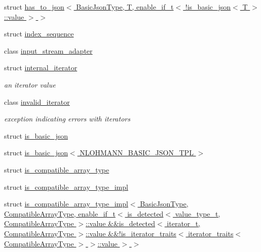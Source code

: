 \begin{DoxyCompactItemize}
\item 
struct \hyperlink{structnlohmann_1_1detail_1_1has__to__json_3_01BasicJsonType_00_01T_00_01enable__if__t_3_01_9is__4a8838c1c30336126696a126041e661c}{has\+\_\+to\+\_\+json$<$ Basic\+Json\+Type, T, enable\+\_\+if\+\_\+t$<$ !is\+\_\+basic\+\_\+json$<$ T $>$\+::value $>$ $>$}
\item 
struct \hyperlink{structnlohmann_1_1detail_1_1index__sequence}{index\+\_\+sequence}
\item 
class \hyperlink{classnlohmann_1_1detail_1_1input__stream__adapter}{input\+\_\+stream\+\_\+adapter}
\item 
struct \hyperlink{structnlohmann_1_1detail_1_1internal__iterator}{internal\+\_\+iterator}
\begin{DoxyCompactList}\small\item\em an iterator value \end{DoxyCompactList}\item 
class \hyperlink{classnlohmann_1_1detail_1_1invalid__iterator}{invalid\+\_\+iterator}
\begin{DoxyCompactList}\small\item\em exception indicating errors with iterators \end{DoxyCompactList}\item 
struct \hyperlink{structnlohmann_1_1detail_1_1is__basic__json}{is\+\_\+basic\+\_\+json}
\item 
struct \hyperlink{structnlohmann_1_1detail_1_1is__basic__json_3_01NLOHMANN__BASIC__JSON__TPL_01_4}{is\+\_\+basic\+\_\+json$<$ N\+L\+O\+H\+M\+A\+N\+N\+\_\+\+B\+A\+S\+I\+C\+\_\+\+J\+S\+O\+N\+\_\+\+T\+P\+L $>$}
\item 
struct \hyperlink{structnlohmann_1_1detail_1_1is__compatible__array__type}{is\+\_\+compatible\+\_\+array\+\_\+type}
\item 
struct \hyperlink{structnlohmann_1_1detail_1_1is__compatible__array__type__impl}{is\+\_\+compatible\+\_\+array\+\_\+type\+\_\+impl}
\item 
struct \hyperlink{structnlohmann_1_1detail_1_1is__compatible__array__type__impl_3_01BasicJsonType_00_01CompatibleAb638dd3c6149bb42b44d6778e8db3f9d}{is\+\_\+compatible\+\_\+array\+\_\+type\+\_\+impl$<$ Basic\+Json\+Type, Compatible\+Array\+Type, enable\+\_\+if\+\_\+t$<$ is\+\_\+detected$<$ value\+\_\+type\+\_\+t, Compatible\+Array\+Type $>$\+::value \&\&is\+\_\+detected$<$ iterator\+\_\+t, Compatible\+Array\+Type $>$\+::value \&\&!is\+\_\+iterator\+\_\+traits$<$ iterator\+\_\+traits$<$ Compatible\+Array\+Type $>$ $>$\+::value $>$ $>$}

\end{DoxyCompactItemize}
